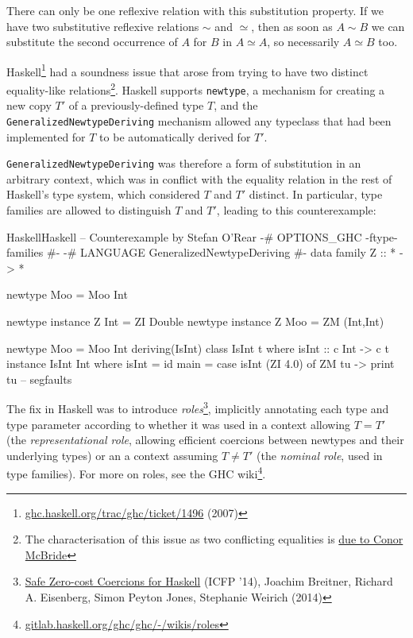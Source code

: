 \documentclass[11pt,oneside]{article}
\newcommand{\code}[1]{\texttt{#1}}
\newenvironment{codegroup}
  {\par\addvspace{\medskipamount}%
   \tcbset{cebox/.append style={before skip=7pt, after skip=7pt}}}
  {\par\addvspace{\medskipamount}}
\begin{document}
There can only be one reflexive relation with this substitution property.  If we have two substitutive reflexive relations \(\sim\) and \(\simeq\), then as soon as \(A \sim B\) we can substitute the second occurrence of \(A\) for \(B\) in \(A \simeq A\), so necessarily \(A \simeq B\) too.

Haskell\footnote{\href{https://ghc.haskell.org/trac/ghc/ticket/1496}{ghc.haskell.org/\allowbreak{}trac/\allowbreak{}ghc/\allowbreak{}ticket/\allowbreak{}1496} (2007)} had a soundness issue that arose from trying to have two distinct equality-like relations\footnote{The characterisation of this issue as two conflicting equalities is \href{https://www.reddit.com/r/haskell/comments/y8kca/generalizednewtypederiving_is_very_very_unsafe/c5tawm8/}{due to Conor McBride}}. Haskell supports \code{newtype}, a mechanism for creating a new copy \(T'\) of a previously-defined type \(T\), and the \code{GeneralizedNewtypeDeriving} mechanism allowed any typeclass that had been implemented for \(T\) to be automatically derived for \(T'\).

\code{GeneralizedNewtypeDeriving} was therefore a form of substitution in an arbitrary context, which was in conflict with the equality relation in the rest of Haskell's type system, which considered \(T\) and \(T'\) distinct. In particular, type families are allowed to distinguish \(T\) and \(T'\), leading to this counterexample:

\begin{codegroup}
\begin{codebox}{Haskell}{Haskell}
-- Counterexample by Stefan O'Rear
{-# OPTIONS_GHC -ftype-families #-}
{-# LANGUAGE GeneralizedNewtypeDeriving #-}
data family Z :: * -> *

newtype Moo = Moo Int

newtype instance Z Int = ZI Double
newtype instance Z Moo = ZM (Int,Int)

newtype Moo = Moo Int deriving(IsInt)
class IsInt t where
    isInt :: c Int -> c t
instance IsInt Int where isInt = id
main = case isInt (ZI 4.0) of
         ZM tu -> print tu -- segfaults
\end{codebox}
\end{codegroup}
The fix in Haskell was to introduce \emph{roles}\footnote{\href{https://dl.acm.org/doi/abs/10.1145/2628136.2628141}{Safe Zero-cost Coercions for Haskell} (ICFP '14), Joachim Breitner, Richard A. Eisenberg, Simon Peyton Jones, Stephanie Weirich (2014)}, implicitly annotating each type and type parameter according to whether it was used in a context allowing \(T = T'\) (the \emph{representational role}, allowing efficient coercions between newtypes and their underlying types) or an a context assuming \(T \neq T'\) (the \emph{nominal role}, used in type families). For more on roles, see the GHC wiki\footnote{\href{https://gitlab.haskell.org/ghc/ghc/-/wikis/roles}{gitlab.haskell.org/\allowbreak{}ghc/\allowbreak{}ghc/\allowbreak{}-/\allowbreak{}wikis/\allowbreak{}roles}}.
\end{document}
